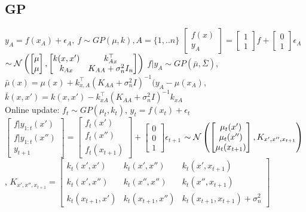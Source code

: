 \subsection{GP}
$y_{A}=f(x_{A})+\epsilon_{A},\ f\sim GP(\mu, k), A=\{1,..n\}$
$\begin{bmatrix} f(x) \\ y_{A}\end{bmatrix} = \begin{bmatrix} 1 \\ 1\end{bmatrix} f + \begin{bmatrix} 0 \\ 1 \end{bmatrix}\epsilon_{A}$
$\sim \mathcal{N}\left(\begin{bmatrix} \mu \\ \mu\end{bmatrix},
    \begin{bmatrix} k(x,x') & k_{Ax}^{\top} \\ k_{Ax} & K_{AA}+\sigma_{n}^{2}I_{n}\end{bmatrix}\right)$
$f|y_{A} \sim GP(\bar{\mu}, \bar{\Sigma})$,
$\bar{\mu}(x) = \mu(x) + k_{x,A}^{\top}(K_{AA}+\sigma_{n}^{2}I)^{-1}(y_{A}-\mu(x_{A})$,
$\bar{k}(x,x')= k(x,x')-k_{xA}^{\top}(K_{AA}+\sigma_{n}^{2}I)^{-1}k_{xA}$\\
Online update:
$f_{t} \sim GP(\mu_{t}, k_{t})$, $y_{t}=f(x_{t})+\epsilon_{t}$
$\begin{bmatrix} f|y_{1:t}(x') \\ f|y_{1:t}(x'')\\ y_{t+1}\end{bmatrix} =
\begin{bmatrix} f_{t}(x') \\ f_{t}(x'') \\ f_{t}(x_{t+1}) \end{bmatrix} +
\begin{bmatrix} 0 \\ 0 \\ 1 \end{bmatrix}\epsilon_{t+1}$
$\sim \mathcal{N}\left(\begin{bmatrix} \mu_{t}(x') \\ \mu_{t}(x'') \\ \mu_{t}(x_{t+1}) \end{bmatrix}, K_{x',x'',x_{t+1}}\right)$,
$K_{x',x'',x_{t+1}} = \begin{bmatrix} k_{t}(x',x') & k_{t}(x',x'') & k_{t}(x',x_{t+1})\\
    k_{t}(x',x'') & k_{t}(x'',x'') & k_{t}(x'',x_{t+1}) \\
    k_{t}(x_{t+1},x') & k_{t}(x_{t+1},x'') & k_{t}(x_{t+1},x_{t+1})+\sigma_{n}^{2}\end{bmatrix}$


